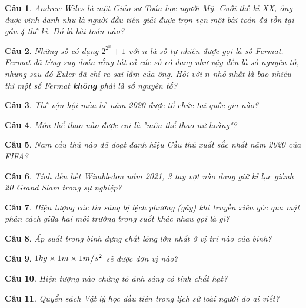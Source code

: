 \documentclass[12pt,a4paper]{article}
\newtheorem{ques}{Câu}
\theoremstyle{nonumberplain}
\begin{document}
\begin{ques}
Andrew Wiles là một Giáo sư Toán học người Mỹ. Cuối thế kỉ XX, ông được vinh danh như là người đầu tiên giải được trọn vẹn một bài toán đã tồn tại gần 4 thế kỉ. Đó là bài toán nào?
\end{ques}
\begin{ques}
Những số có dạng \(2^{2^n} + 1\) với \(n\) là số tự nhiên được gọi là số Fermat. Fermat đã từng suy đoán rằng tất cả các số có dạng như vậy đều là số nguyên tố, nhưng sau đó Euler đã chỉ ra sai lầm của ông. Hỏi với \(n\) nhỏ nhất là bao nhiêu thì một số Fermat \textbf{không} phải là số nguyên tố?
\end{ques}
\begin{ques}
Thế vận hội mùa hè năm 2020 được tổ chức tại quốc gia nào?
\end{ques}
\begin{ques}
Môn thể thao nào được coi là \textit{"môn thể thao nữ hoàng"}?
\end{ques}
\begin{ques}
Nam cầu thủ nào đã đoạt danh hiệu Cầu thủ xuất sắc nhất năm 2020 của FIFA?
\end{ques}
\begin{ques}
Tính đến hết Wimbledon năm 2021, 3 tay vợt nào đang giữ kỉ lục giành 20 Grand Slam trong sự nghiệp?
\end{ques}
\begin{ques}
Hiện tượng các tia sáng bị lệch phương (gãy) khi truyền xiên góc qua mặt phân cách giữa hai môi trường trong suốt khác nhau gọi là gì?
\end{ques}
\begin{ques}
Áp suất trong bình đựng chất lỏng lớn nhất ở vị trí nào của bình?
\end{ques}
\begin{ques}
\(1kg \times 1m \times 1{m \mathord{\left/
 {\vphantom {m {{s^2}}}} \right.
 \kern-\nulldelimiterspace} {{s^2}}}\) sẽ được đơn vị nào?
\end{ques}
\begin{ques}
Hiện tượng nào chứng tỏ ánh sáng có tính chất hạt?
\end{ques}
\begin{ques}
Quyển sách Vật lý học đầu tiên trong lịch sử loài người do ai viết?
\end{ques}
\end{document}

